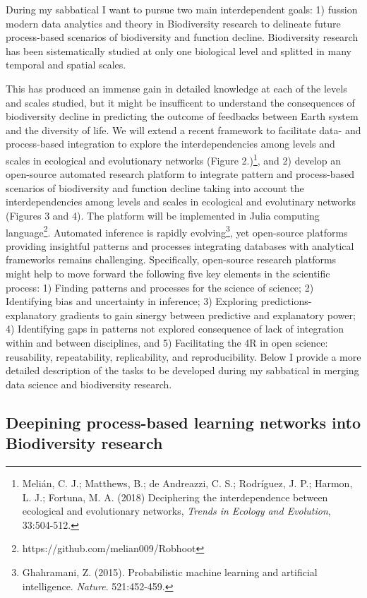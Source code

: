 \documentclass[authoryear,1p,12pt]{elsarticle}
\begin{document}
During my sabbatical I want to pursue two main interdependent goals: 1) fussion
modern data analytics and theory in Biodiversity research to delineate
future process-based scenarios of biodiversity and function
decline. Biodiversity research has been sistematically studied at only
one biological level and splitted in many temporal and spatial scales.

\pagebreak

This has produced an immense gain in detailed knowledge at each of the
levels and scales studied, but it might be insufficent to understand
the consequences of biodiversity decline in predicting the outcome of
feedbacks between Earth system and the diversity of life. We will
extend a recent framework to facilitate data- and process-based
integration to explore the interdependencies among levels and scales
in ecological and evolutionary networks (Figure 2.)\footnote{Melián,
  C. J.; Matthews, B.; de Andreazzi, C. S.; Rodríguez, J. P.; Harmon,
  L. J.; Fortuna, M. A. (2018) Deciphering the interdependence between
  ecological and evolutionary networks, {\em Trends in Ecology and
    Evolution}, 33:504-512.}, and 2) develop an open-source automated
research platform to integrate pattern and process-based scenarios of
biodiversity and function decline taking into account the
interdependencies among levels and scales in ecological and
evolutinary networks (Figures 3 and 4). The platform will be
implemented in Julia computing
language\footnote{https://github.com/melian009/Robhoot}. Automated
inference is rapidly evolving\footnote{Ghahramani,
  Z. (2015). Probabilistic machine learning and artificial
  intelligence. {\em Nature}. 521:452-459.}, yet open-source platforms
providing insightful patterns and processes integrating databases with
analytical frameworks remains challenging. Specifically, open-source
research platforms might help to move forward the following five key
elements in the scientific process: 1) Finding patterns and processes
for the science of science; 2) Identifying bias and uncertainty in
inference; 3) Exploring predictions-explanatory gradients to gain
sinergy between predictive and explanatory power; 4) Identifying gaps
in patterns not explored consequence of lack of integration within and
between disciplines, and 5) Facilitating the 4R in open science:
reusability, repeatability, replicability, and reproducibility. Below
I provide a more detailed description of the tasks to be developed
during my sabbatical in merging data science and biodiversity
research.

\subsection{{\bf Deepining process-based learning networks into Biodiversity research}}
\end{document}
